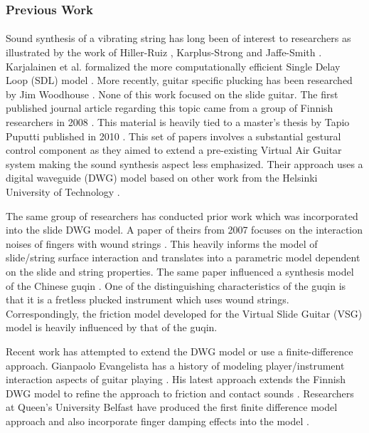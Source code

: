 \documentclass[12pt]{article}
\begin{document}
\subsubsection*{Previous Work}
\paragraph{}
Sound synthesis of a vibrating string has long been of interest to researchers as illustrated by the work of Hiller-Ruiz \cite{hiller_synthesizing_1971}, Karplus-Strong \cite{karplus_digital_1983} and Jaffe-Smith \cite{jaffe_extensions_1983}. Karjalainen et al. formalized the more computationally efficient Single Delay Loop (SDL) model \cite{karjalainen_plucked-string_1998}. More recently, guitar specific plucking has been researched by Jim Woodhouse \cite{woodhouse_synthesis_2004}. None of this work focused on the slide guitar. The first published journal article regarding this topic came from a group of Finnish researchers in 2008 \cite{pakarinen_virtual_2008}. This material is heavily tied to a master’s thesis by Tapio Puputti published in 2010 \cite{puputti_real-time_2012}. This set of papers involves a substantial gestural control component as they aimed to extend a pre-existing Virtual Air Guitar system making the sound synthesis aspect less emphasized. Their approach uses a digital waveguide (DWG) model based on other work from the Helsinki University of Technology \cite{valimaki_development_1998} \cite{karjalainen_plucked-string_1998}.

The same group of researchers has conducted prior work which was incorporated into the slide DWG model. A paper of theirs from 2007 focuses on the interaction noises of fingers with wound strings \cite{pakarinen_analysis_2007}. This heavily informs the model of slide/string surface interaction and translates into a parametric model dependent on the slide and string properties. The same paper influenced a synthesis model of the Chinese guqin \cite{penttinen_model-based_2006}. One of the distinguishing characteristics of the guqin is that it is a fretless plucked instrument which uses wound strings. Correspondingly, the friction model developed for the Virtual Slide Guitar (VSG) model is heavily influenced by that of the guqin.

Recent work has attempted to extend the DWG model or use a finite-difference approach. Gianpaolo Evangelista has a history of modeling player/instrument interaction aspects of guitar playing \cite{evangelista_physical_2011} \cite{evangelista_playerinstrument_2010}. His latest approach extends the Finnish DWG model to refine the approach to friction and contact sounds \cite{evangelista_physical_2012}. Researchers at Queen’s University Belfast have produced the first finite difference model approach and also incorporate finger damping effects into the model \cite{bhanuprakash_finite_2020}.
\end{document}
